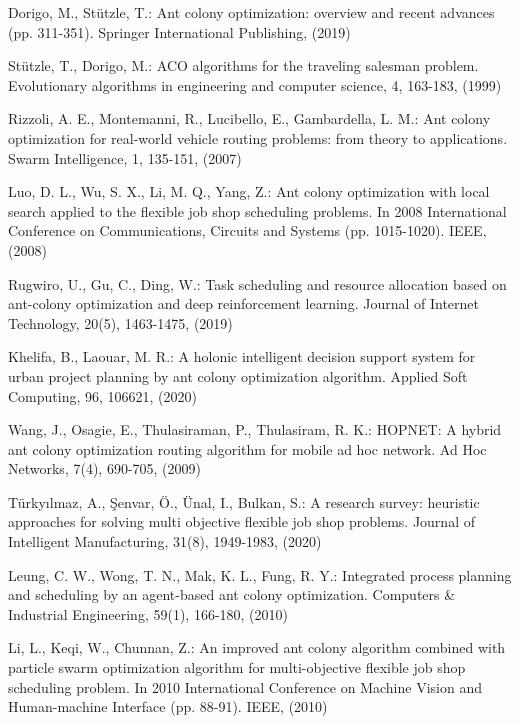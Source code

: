 \begin{thebibliography}{8}
	Dorigo, M.,  Stützle, T.: Ant colony optimization: overview and recent advances (pp. 311-351). Springer International Publishing, (2019)
	
	Stützle, T., Dorigo, M.: ACO algorithms for the traveling salesman problem. Evolutionary algorithms in engineering and computer science, 4, 163-183, (1999)
	
	Rizzoli, A. E., Montemanni, R., Lucibello, E., Gambardella, L. M.: Ant colony optimization for real-world vehicle routing problems: from theory to applications. Swarm Intelligence, 1, 135-151, (2007)
	
	Luo, D. L., Wu, S. X., Li, M. Q., Yang, Z.: Ant colony optimization with local search applied to the flexible job shop scheduling problems. In 2008 International Conference on Communications, Circuits and Systems (pp. 1015-1020). IEEE, (2008)
	
	Rugwiro, U., Gu, C., Ding, W.: Task scheduling and resource allocation based on ant-colony optimization and deep reinforcement learning. Journal of Internet Technology, 20(5), 1463-1475, (2019)
	
	Khelifa, B., Laouar, M. R.: A holonic intelligent decision support system for urban project planning by ant colony optimization algorithm. Applied Soft Computing, 96, 106621, (2020)
	
	Wang, J., Osagie, E., Thulasiraman, P., Thulasiram, R. K.: HOPNET: A hybrid ant colony optimization routing algorithm for mobile ad hoc network. Ad Hoc Networks, 7(4), 690-705, (2009)
	
	
	Türkyılmaz, A., Şenvar, Ö., Ünal, I., Bulkan, S.: A research survey: heuristic approaches for solving multi objective flexible job shop problems. Journal of Intelligent Manufacturing, 31(8), 1949-1983,  (2020)
	
	
	
	Leung, C. W., Wong, T. N., Mak, K. L., Fung, R. Y.: Integrated process planning and scheduling by an agent-based ant colony optimization. Computers \& Industrial Engineering, 59(1), 166-180,  (2010)
	
	Li, L., Keqi, W., Chunnan, Z.: An improved ant colony algorithm combined with particle swarm optimization algorithm for multi-objective flexible job shop scheduling problem. In 2010 International Conference on Machine Vision and Human-machine Interface (pp. 88-91). IEEE, (2010)
	

\end{thebibliography}
